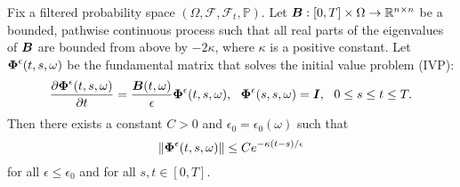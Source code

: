 \begin{lemma} \label{expb} Fix a filtered probability space $(\Omega, \mathcal{F}, \mathcal{F}_t, \mathbb{P})$. Let $\boldsymbol{B}: [0,T] \times \Omega \to \mathbb{R}^{n \times n}$ be a bounded, pathwise continuous  process such that all real parts of the eigenvalues of $\boldsymbol{B}$ are bounded from above by $-2\kappa$, where $\kappa$ is a positive constant. Let $\boldsymbol{\Phi}^\epsilon(t,s,\omega)$ be the fundamental matrix that solves the initial value problem (IVP):
\begin{equation} \label{ivp}
\frac{\partial \vecc{\Phi}^\epsilon(t,s,\omega)}{\partial t} = \frac{\vecc{B}(t,\omega)}{\epsilon} \vecc{\Phi}^\epsilon(t,s,\omega), \ \ \vecc{\Phi}^\epsilon(s,s,\omega)=\vecc{I}, \ \ 0 \leq s \leq t \leq T.
\end{equation}
Then there exists a constant $C > 0$ and $\epsilon_{0}=\epsilon_0(\omega)$ such that 
\begin{equation}\|\boldsymbol{\Phi}^\epsilon(t,s,\omega)\| \leq C e^{-\kappa(t-s)/\epsilon} \end{equation} for all $\epsilon \leq \epsilon_{0}$ and for all $s,t \in [0,T]$.
\end{lemma}
